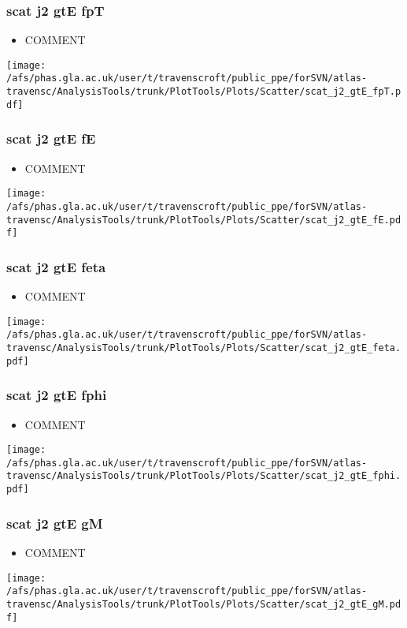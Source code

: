 \documentclass{beamer}
\begin{document}
\begin{frame}
\frametitle{scat j2 gtE fpT}
\begin{itemize}
\item COMMENT
\end{itemize}
\begin{center}
\texttt{[image: /afs/phas.gla.ac.uk/user/t/travenscroft/public\_ppe/forSVN/atlas-travensc/AnalysisTools/trunk/PlotTools/Plots/Scatter/scat\_j2\_gtE\_fpT.pdf]}
\end{center}
\end{frame}

\begin{frame}
\frametitle{scat j2 gtE fE}
\begin{itemize}
\item COMMENT
\end{itemize}
\begin{center}
\texttt{[image: /afs/phas.gla.ac.uk/user/t/travenscroft/public\_ppe/forSVN/atlas-travensc/AnalysisTools/trunk/PlotTools/Plots/Scatter/scat\_j2\_gtE\_fE.pdf]}
\end{center}
\end{frame}

\begin{frame}
\frametitle{scat j2 gtE feta}
\begin{itemize}
\item COMMENT
\end{itemize}
\begin{center}
\texttt{[image: /afs/phas.gla.ac.uk/user/t/travenscroft/public\_ppe/forSVN/atlas-travensc/AnalysisTools/trunk/PlotTools/Plots/Scatter/scat\_j2\_gtE\_feta.pdf]}
\end{center}
\end{frame}

\begin{frame}
\frametitle{scat j2 gtE fphi}
\begin{itemize}
\item COMMENT
\end{itemize}
\begin{center}
\texttt{[image: /afs/phas.gla.ac.uk/user/t/travenscroft/public\_ppe/forSVN/atlas-travensc/AnalysisTools/trunk/PlotTools/Plots/Scatter/scat\_j2\_gtE\_fphi.pdf]}
\end{center}
\end{frame}

\begin{frame}
\frametitle{scat j2 gtE gM}
\begin{itemize}
\item COMMENT
\end{itemize}
\begin{center}
\texttt{[image: /afs/phas.gla.ac.uk/user/t/travenscroft/public\_ppe/forSVN/atlas-travensc/AnalysisTools/trunk/PlotTools/Plots/Scatter/scat\_j2\_gtE\_gM.pdf]}
\end{center}
\end{frame}
\end{document}
